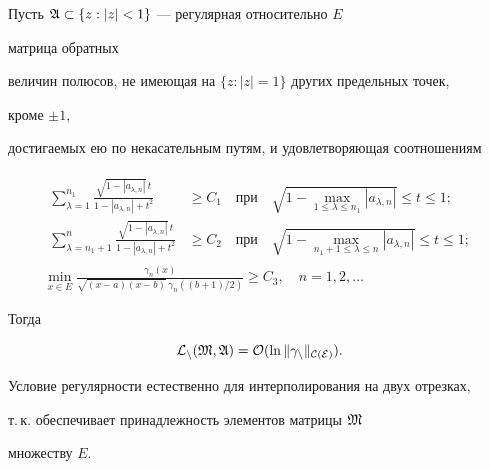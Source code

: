 \begin{thmnonum}


Пусть $\frak A\subset\{z:|z|<1\}$ --- регулярная относительно $E$


матрица обратных


величин полюсов, не имеющая на $\{z:|z|=1\}$ других предельных точек,


кроме $\pm 1$,


достигаемых ею по некасательным путям, и удовлетворяющая соотношениям


\begin{gather}


\begin{split}


\sum^{n_1}_{\lambda=1}


\frac{\sqrt{1-|a_{\lambda,n}|}\,t}{1-|a_{\lambda,n}|+t^2}


&\ge C_1\quad\text{при} \quad


\sqrt{1-\max_{1\le\lambda\le n_1}|a_{\lambda,n}|}\le t\le 1; \\


\sum^n_{\lambda=n_1+1}\frac{\sqrt{1-|a_{\lambda,n}|}\,t}


{1-|a_{\lambda,n}|+t^2}&\ge C_2\quad\text{при}\quad


\sqrt{1-\max_{n_1+1\le\lambda\le n}|a_{\lambda,n}|}\le t\le 1;


\end{split}


\\


\min_{x\in E}\frac{\gamma_n(x)}


{\sqrt{(x-a)(x-b)}\,\gamma_n((b+1)/2)}\ge C_3,\quad


n=1,2,\dotsc


\end{gather}


Тогда


$$


\cal L_n(\frak M,\frak A)=O(\ln\|\gamma_n\|_{C(E)}).


$$


\end{thmnonum}





\begin{note}


Условие регулярности естественно для интерполирования на двух отрезках,


т.\,к. обеспечивает принадлежность элементов матрицы $\frak M$


множеству $E$.


\end{note}





